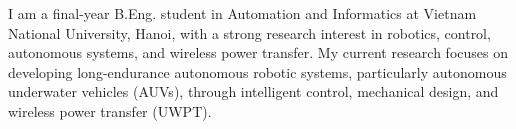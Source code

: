 
\begin{cvparagraph}

I am a final-year B.Eng. student in Automation and Informatics at Vietnam National University, Hanoi, with a strong research interest in robotics, control, autonomous systems, and wireless power transfer. My current research focuses on developing long-endurance autonomous robotic systems, particularly autonomous underwater vehicles (AUVs), through intelligent control, mechanical design, and wireless power transfer (UWPT).

\end{cvparagraph}